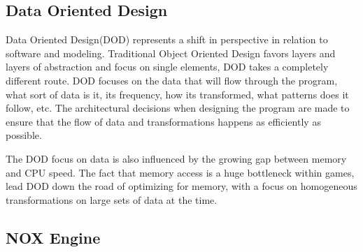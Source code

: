 \subsection*{Data Oriented Design}
Data Oriented Design(DOD) represents a shift in perspective in relation to software and modeling. 
Traditional Object Oriented Design favors layers and layers of abstraction and focus on single elements, DOD takes a completely different route. 
DOD focuses on the data that will flow through the program, what sort of data is it, its frequency, how its transformed, what patterns does it follow, etc. 
The architectural decisions when designing the program are made to ensure that the flow of data and transformations happens as efficiently as possible.
\cite{noel_dod_shoot_in_foot, dod_com} 

The DOD focus on data is also influenced by the growing gap between memory and CPU speed. 
The fact that memory access is a huge bottleneck within games, lead DOD down the road of optimizing for memory, 
with a focus on homogeneous transformations on large sets of data at the time.
\cite{pitfalls_of_OOP}

\subsection*{NOX Engine}
